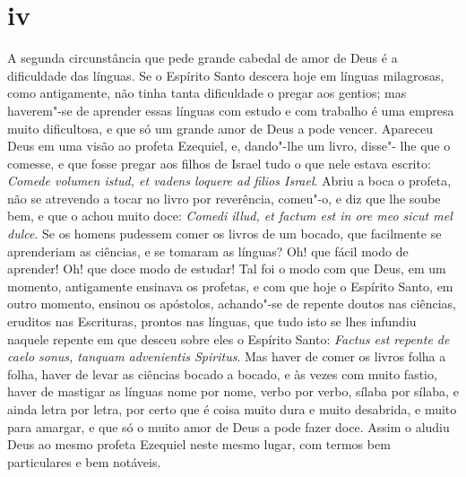 \section{iv}

A segunda circunstância que pede grande cabedal de amor de Deus é a
dificuldade das línguas. Se o Espírito Santo descera hoje em línguas
milagrosas, como antigamente, não tinha tanta dificuldade o pregar aos
gentios; mas haverem"-se de aprender essas línguas com estudo e com
trabalho é uma empresa muito dificultosa, e que só um grande amor de
Deus a pode vencer. Apareceu Deus em uma visão ao profeta Ezequiel, e,
dando"-lhe um livro, disse"- lhe que o comesse, e que fosse pregar aos
filhos de Israel tudo o que nele estava escrito: \emph{Comede volumen
istud, et vadens loquere ad filios Israel}. Abriu a boca o %
profeta, não se atrevendo a tocar no livro por reverência, comeu"-o, e
diz que lhe soube bem, e que o achou muito doce: \emph{Comedi illud, et
factum est in ore meo sicut mel dulce}. Se os homens pudessem %
comer os livros de um bocado, que facilmente se aprenderiam as ciências,
e se tomaram as línguas? Oh! que fácil modo de aprender! Oh! que doce
modo de estudar! Tal foi o modo com que Deus, em um momento, antigamente
ensinava os profetas, e com que hoje o Espírito Santo, em outro momento,
ensinou os apóstolos, achando"-se de repente doutos nas ciências,
eruditos nas Escrituras, prontos nas línguas, que tudo isto se lhes
infundiu naquele repente em que
desceu sobre eles o Espírito Santo: \emph{Factus est repente de caelo
sonus, tanquam advenientis Spiritus}. Mas haver de comer os livros folha
a folha, haver de levar as ciências bocado a bocado, e às vezes com
muito fastio, haver de mastigar as línguas nome por nome, verbo por
verbo, sílaba por sílaba, e ainda letra por letra, por certo que é coisa
muito dura e muito desabrida, e muito para amargar, e que só o muito
amor de Deus a pode fazer doce. Assim o aludiu Deus ao mesmo profeta
Ezequiel neste mesmo lugar, com termos bem particulares e bem notáveis.

